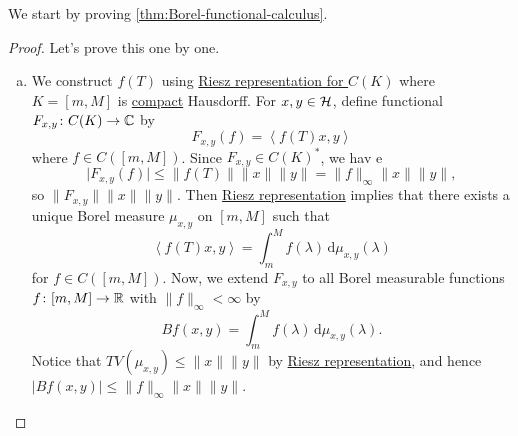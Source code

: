 We start by proving \autoref{thm:Borel-functional-calculus}.
\begin{proof}
	Let's prove this one by one.
	\begin{enumerate}[(a)]
		\item We construct \(f(T)\)  using \hyperref[thm:Riesz-representation-for-C-K]{Riesz representation for \(C(K)\)} where \(K = [m, M]\) is \hyperref[def:compact]{compact} Hausdorff. For \(x, y\in \mathcal{\MakeUppercase{h}} \), define functional \(F_{x, y} \colon C(K) \to \mathbb{\MakeUppercase{c}} \) by
		      \[
			      F_{x, y} (f) = \left\langle f(T)x, y \right\rangle
		      \]
		      where \(f\in C([m, M])\). Since \(F_{x, y} \in C(K)^{\ast} \), we hav e
		      \[
			      \vert F_{x, y}(f) \vert
			      \leq \lVert f(T) \rVert  \lVert x \rVert \lVert y \rVert
			      = \lVert f \rVert _{\infty } \lVert x \rVert \lVert y \rVert,
		      \]
		      so \(\lVert F_{x, y} \rVert \lVert x \rVert \lVert y \rVert \). Then \hyperref[thm:Riesz-representation-for-C-K]{Riesz representation} implies that there exists a unique Borel measure \(\mu _{x, y} \) on \([m, M]\) such that
		      \[
			      \left\langle f(T) x, y  \right\rangle
			      = \int_{m}^{M} f(\lambda ) \,\mathrm{d}\mu _{x, y}(\lambda )
		      \]
		      for \(f\in C([m, M])\). Now, we extend \(F_{x, y}\) to all Borel measurable functions \(f\colon [m, M] \to \mathbb{\MakeUppercase{r}} \) with \(\lVert f \rVert _\infty < \infty \) by
		      \[
			      Bf(x, y) = \int_{m}^{M} f(\lambda ) \,\mathrm{d}\mu _{x, y} (\lambda ).
		      \]
		      Notice that \(TV(\mu _{x, y}) \leq \lVert x \rVert \lVert y \rVert \) by \hyperref[thm:Riesz-representation-for-C-K]{Riesz representation}, and hence \(\vert Bf(x, y) \vert \leq \lVert f \rVert _\infty \lVert x \rVert \lVert y \rVert \).


\end{enumerate}
\end{proof}
